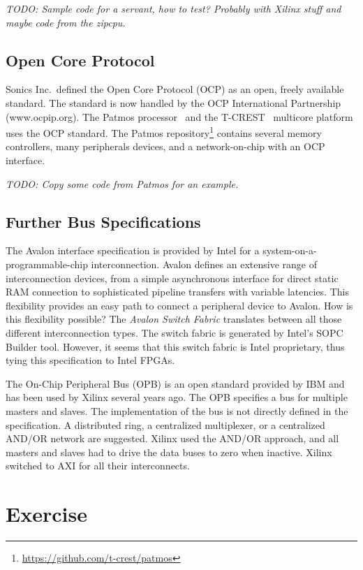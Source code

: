 \documentclass[%
    10pt,
    headinclude, footinclude=false,
    openright, %
    notitlepage,
    cleardoublepage=empty,
    headsepline,
    numbers=noenddot,
    bibliography=totoc, index=totoc,
    ]{scrbook}
\newcommand{\todo}[1]{{\emph{TODO: #1}}}
\begin{document}
\todo{Sample code for a servant, how to test? Probably with Xilinx stuff and maybe
code from the zipcpu.}

\subsection{Open Core Protocol}

Sonics Inc.\ defined the Open Core Protocol (OCP) \cite{soc:ocp} as
an open, freely available standard. The standard is now handled by
the OCP International Partnership (www.ocpip.org).
The Patmos processor~\cite{patmos:rts2018} and the
T-CREST~\cite{t-crest:2015} multicore platform uses the OCP
standard. The Patmos repository\footnote{\url{https://github.com/t-crest/patmos}}
contains several memory controllers, many peripherals devices,
and a network-on-chip with an OCP interface.

\todo{Copy some code from Patmos for an example.}

\subsection{Further Bus Specifications}

The Avalon \cite{soc:avalon} interface specification is provided by
Intel for a system-\-on-a\--pro\-grammable-\-chip interconnection.
Avalon defines an extensive range of interconnection devices, from
a simple asynchronous interface for direct static RAM
connection to sophisticated pipeline transfers with variable
latencies. This flexibility provides an easy path to connect a
peripheral device to Avalon. How is this flexibility possible? The
\emph{Avalon Switch Fabric} translates between all those different
interconnection types. The switch fabric is generated by Intel's
SOPC Builder tool. However, it seems that this switch fabric is
Intel proprietary, thus tying this specification to Intel FPGAs.

The On-Chip Peripheral Bus (OPB) \cite{soc:opb} is an open standard
provided by IBM and has been used by Xilinx several years ago.
The OPB specifies a bus for
multiple masters and slaves. The implementation of the bus is not
directly defined in the specification. A distributed ring, a
centralized multiplexer, or a centralized AND/OR network are
suggested. Xilinx used the AND/OR approach, and all masters and
slaves had to drive the data buses to zero when inactive.
Xilinx switched to AXI for all their interconnects.

\section{Exercise}
\end{document}
